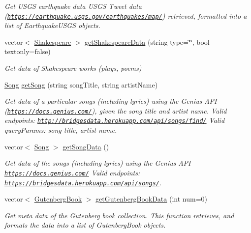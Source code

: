 \begin{DoxyCompactItemize}
\begin{DoxyCompactList}\small\item\em Get U\+S\+GS earthquake data U\+S\+GS Tweet data (\href{https://earthquake.usgs.gov/earthquakes/map/}{\tt https\+://earthquake.\+usgs.\+gov/earthquakes/map/}) retrieved, formatted into a list of Earthquake\+U\+S\+GS objects. \end{DoxyCompactList}\item 
vector$<$ \hyperlink{classbridges_1_1dataset_1_1_shakespeare}{Shakespeare} $>$ \hyperlink{classbridges_1_1_data_source_a8b73299a4c1c71d2e32431a8d4a7be81}{get\+Shakespeare\+Data} (string type=\char`\"{}\char`\"{}, bool textonly=false)
\begin{DoxyCompactList}\small\item\em Get data of Shakespeare works (plays, poems) \end{DoxyCompactList}\item 
\hyperlink{classbridges_1_1dataset_1_1_song}{Song} \hyperlink{classbridges_1_1_data_source_a284c9d572415b67df6989ab8ab97d0e2}{get\+Song} (string song\+Title, string artist\+Name)
\begin{DoxyCompactList}\small\item\em Get data of a particular songs (including lyrics) using the Genius A\+PI (\href{https://docs.genius.com/}{\tt https\+://docs.\+genius.\+com/}), given the song title and artist name. Valid endpoints\+: \href{http://bridgesdata.herokuapp.com/api/songs/find/}{\tt http\+://bridgesdata.\+herokuapp.\+com/api/songs/find/} Valid query\+Params\+: song title, artist name. \end{DoxyCompactList}\item 
vector$<$ \hyperlink{classbridges_1_1dataset_1_1_song}{Song} $>$ \hyperlink{classbridges_1_1_data_source_a5e8d035a1becf96c71569e0966e93849}{get\+Song\+Data} ()
\begin{DoxyCompactList}\small\item\em Get data of the songs (including lyrics) using the Genius A\+PI \href{https://docs.genius.com/}{\tt https\+://docs.\+genius.\+com/} Valid endpoints\+: \href{https://bridgesdata.herokuapp.com/api/songs/}{\tt https\+://bridgesdata.\+herokuapp.\+com/api/songs/}. \end{DoxyCompactList}\item 
vector$<$ \hyperlink{classbridges_1_1dataset_1_1_gutenberg_book}{Gutenberg\+Book} $>$ \hyperlink{classbridges_1_1_data_source_a1057509d6adf4cbfd881854adb274304}{get\+Gutenberg\+Book\+Data} (int num=0)
\begin{DoxyCompactList}\small\item\em Get meta data of the Gutenberg book collection. This function retrieves, and formats the data into a list of Gutenberg\+Book objects. \end{DoxyCompactList}\item 

\end{DoxyCompactItemize}
